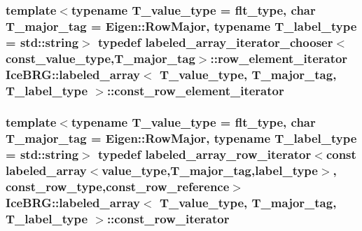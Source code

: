 \subsubsection[{const\+\_\+row\+\_\+element\+\_\+iterator}]{\setlength{\rightskip}{0pt plus 5cm}template$<$typename T\+\_\+value\+\_\+type = flt\+\_\+type, char T\+\_\+major\+\_\+tag = Eigen\+::\+Row\+Major, typename T\+\_\+label\+\_\+type = std\+::string$>$ typedef {\bf labeled\+\_\+array\+\_\+iterator\+\_\+chooser}$<${\bf const\+\_\+value\+\_\+type},T\+\_\+major\+\_\+tag$>$\+::{\bf row\+\_\+element\+\_\+iterator} {\bf Ice\+B\+R\+G\+::labeled\+\_\+array}$<$ T\+\_\+value\+\_\+type, T\+\_\+major\+\_\+tag, T\+\_\+label\+\_\+type $>$\+::{\bf const\+\_\+row\+\_\+element\+\_\+iterator}}\label{classIceBRG_1_1labeled__array_a15c0340b56b118a2a9f4b3e644de7d71}
\hypertarget{classIceBRG_1_1labeled__array_a81050e4e902b564b0c06224224a5c066}{}
\subsubsection[{const\+\_\+row\+\_\+iterator}]{\setlength{\rightskip}{0pt plus 5cm}template$<$typename T\+\_\+value\+\_\+type = flt\+\_\+type, char T\+\_\+major\+\_\+tag = Eigen\+::\+Row\+Major, typename T\+\_\+label\+\_\+type = std\+::string$>$ typedef {\bf labeled\+\_\+array\+\_\+row\+\_\+iterator}$<$const {\bf labeled\+\_\+array}$<${\bf value\+\_\+type},T\+\_\+major\+\_\+tag,{\bf label\+\_\+type}$>$, {\bf const\+\_\+row\+\_\+type},{\bf const\+\_\+row\+\_\+reference}$>$ {\bf Ice\+B\+R\+G\+::labeled\+\_\+array}$<$ T\+\_\+value\+\_\+type, T\+\_\+major\+\_\+tag, T\+\_\+label\+\_\+type $>$\+::{\bf const\+\_\+row\+\_\+iterator}}\label{classIceBRG_1_1labeled__array_a81050e4e902b564b0c06224224a5c066}
\hypertarget{classIceBRG_1_1labeled__array_ac210266c8ef4db02af31dd1a1a2625f5}{}
